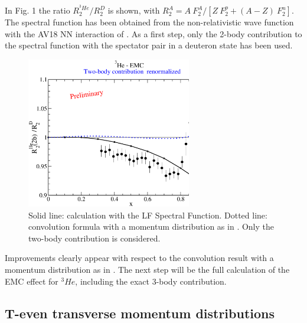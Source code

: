 { In Fig. 1 the ratio $R_2^{^3He}/R_2^D$ is shown, with $R_2^A = A~ F_2^A/[Z ~F_2^p + (A-Z)~F_2^n]$.
The  spectral function has been obtained from the non-relativistic wave function  with the AV18 NN interaction of \cite{KRV}. As a first step, only
the 2-body contribution 
to the spectral function with the spectator pair  in a {{deuteron state}}
has been used.
 \begin{figure}
 \vspace{2mm}
\centerline{\includegraphics[width=7.2cm]{plots/emc_018.eps}}
 \caption{Solid line: calculation with the {{LF Spectral Function}}. 
Dotted line: {convolution formula  with a momentum distribution as in \cite{Sauer}}. Only  the two-body contribution is considered.}
 \end{figure}
\vspace{0mm} 
{{Improvements clearly appear with respect to the
convolution result with a momentum distribution as in \cite{Sauer}}.
 The next step will be the full calculation of the EMC effect for $^3He$, including the exact
3-body contribution. 
}}
\vspace{-3mm} 
\subsection{T-even transverse momentum distributions }


